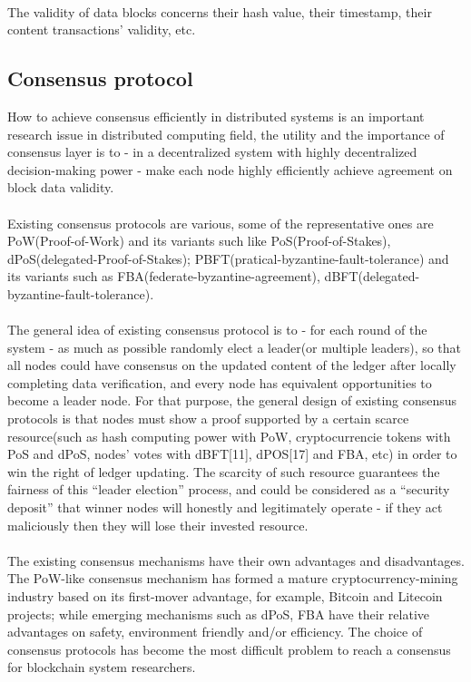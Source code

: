 \documentclass[doublespacing]{bmcart}
\begin{document}
\begin{CJK*}{UTF8}{gbsn}
\paragraph{} The validity of data blocks concerns their hash value, their timestamp, their content transactions' validity, etc.
\subsection{Consensus protocol}
How to achieve consensus efficiently in distributed systems is an important research issue in distributed computing field, the utility and the importance of consensus layer is to - in a decentralized system with highly decentralized decision-making power - make each node highly efficiently achieve agreement on block data validity.
\paragraph{} Existing consensus protocols are various, some of the representative ones are PoW(Proof-of-Work) and its variants such like PoS(Proof-of-Stakes), dPoS(delegated-Proof-of-Stakes); PBFT(pratical-byzantine-fault-tolerance) and its variants such as FBA(federate-byzantine-agreement), dBFT(delegated-byzantine-fault-tolerance). 
\paragraph{} The general idea of existing consensus protocol is to - for each round of the system - as much as possible randomly elect a leader(or multiple leaders), so that all nodes could have consensus on the updated content of the ledger after locally completing data verification, and every node has equivalent opportunities to become a leader node. For that purpose, the general design of existing consensus protocols is that nodes must show a proof supported by a certain scarce resource(such as hash computing power with PoW, cryptocurrencie tokens with PoS and dPoS, nodes' votes with dBFT[11], dPOS[17] and FBA, etc) in order to win the right of ledger updating. The scarcity of such resource guarantees the fairness of this ``leader election'' process, and could be considered as a ``security deposit'' that winner nodes will honestly and legitimately operate - if they act maliciously then they will lose their invested resource.
\paragraph{} The existing consensus mechanisms have their own advantages and disadvantages. The PoW-like consensus mechanism has formed a mature cryptocurrency-mining industry based on its first-mover advantage, for example, Bitcoin and Litecoin projects; while emerging mechanisms such as dPoS, FBA have their relative advantages on safety, environment friendly and/or efficiency. The choice of consensus protocols has become the most difficult problem to reach a consensus for blockchain system researchers.

\end{CJK*}
\end{document}
